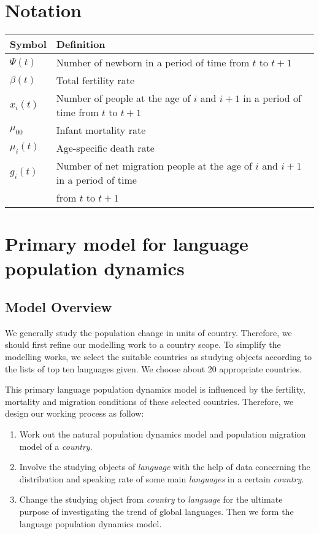 \documentclass{mcmthesis}
\begin{document}
\section{Notation}
\begin{tabular}{|l|l|}
  \hline
  \textbf{Symbol} & \textbf{Definition} \\
  \hline
  $\Psi(t)$ &   Number of newborn in a period of time from $t$ to $t+1$  \\
  \hline
  $\beta(t)$ &   Total fertility rate   \\
  \hline
  $x_i(t)$  & Number of people at the age of $i$ and $i+1$ in a period of time from $t$ to $t+1$\\
  \hline
  $\mu_{00}$ & Infant mortality rate \\
  \hline
  $\mu_i(t) $ & Age-specific death rate \\ \hline
  $ g_i(t)$ & Number of net migration people at the age of $i$ and $i+1$ in a period of time \\ & from $t$ to $t+1$  \\ \hline
\end{tabular}
\section{Primary model for language population dynamics}

\subsection{Model Overview}

We generally study the population change in units of country. Therefore, we should first refine our modelling work to a country scope. To simplify the modelling works, we select the suitable countries as studying objects according to the lists of top ten languages given. We choose about 20 appropriate countries.

This primary language population dynamics model is influenced by the fertility, mortality and migration conditions of these selected countries. Therefore, we design our working process as follow:

\begin{enumerate}[Step 1:]
  \item Work out the natural population dynamics model and population migration model of a \emph{country}.
  \item Involve the studying objects of \emph{language} with the help of data concerning the distribution and speaking rate of some main \emph{languages} in a certain \emph{country}.
  \item Change the studying object from \emph{country} to \emph{language} for the ultimate purpose of investigating the trend of global languages. Then we form the language population dynamics model.
\end{enumerate}
\end{document}
